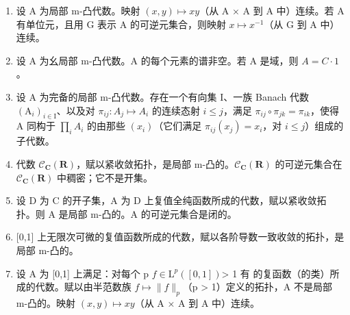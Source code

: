 \begin{enumerate}
\def\labelenumi{\alph{enumi})}
\setcounter{enumi}{1}
\item
  设 A 为局部 m-凸代数。映射 \((x,y)\mapsto xy\)（从 A × A 到 A 中）连续。若 A 有单位元，且用 G 表示 A 的可逆元集合，则映射 \(x\mapsto x^{-1}\)（从 G 到 A 中）连续。
\item
  设 A 为幺局部 m-凸代数。A 的每个元素的谱非空。若 A 是域，则 \(A = C \cdot 1\)。
\item
  设 A 为完备的局部 m-凸代数。存在一个有向集 I、一族 Banach 代数 \((\mathrm{A}_{i})_{i\in\mathrm{I}}\)、以及对 \(\pi_{ij}\colon A_{j}\mapsto A_{i}\) 的连续态射 \(i\leqslant j\)，满足 \(\pi_{ij}\circ\pi_{jk}=\pi_{ik}\)，使得 A 同构于 \(\prod_{i}A_{i}\) 的由那些 \((x_{i})\)（它们满足 \(\pi_{ij}(x_{j})=x_{i}\)，对 \(i\leqslant j\)）组成的子代数。
\item
  代数 \(\mathcal{C}_{\mathbf{C}}(\mathbf{R})\)，赋以紧收敛拓扑，是局部 m-凸的。\(\mathcal{C}_{\mathbf{C}}(\mathbf{R})\) 的可逆元集合在 \(\mathcal{C}_{\mathbf{C}}(\mathbf{R})\) 中稠密；它不是开集。
\item
  设 D 为 C 的开子集，A 为 D 上复值全纯函数所成的代数，赋以紧收敛拓扑。则 A 是局部 m-凸的。A 的可逆元集合是闭的。
\item
  {[}0,1{]} 上无限次可微的复值函数所成的代数，赋以各阶导数一致收敛的拓扑，是局部 m-凸的。
\item
  设 A 为 {[}0,1{]} 上满足：对每个 p \(f \in \mathrm{L}^{p}([0,1])\)\textgreater{ 1 有 } 的复函数（的类）所成的代数。赋以由半范数族 \(f \mapsto \|f\|_{p}\)（p \textgreater{} 1）定义的拓扑，A 不是局部 m-凸的。映射 \((x,y) \mapsto xy\)（从 A × A 到 A 中）连续。
\end{enumerate}

